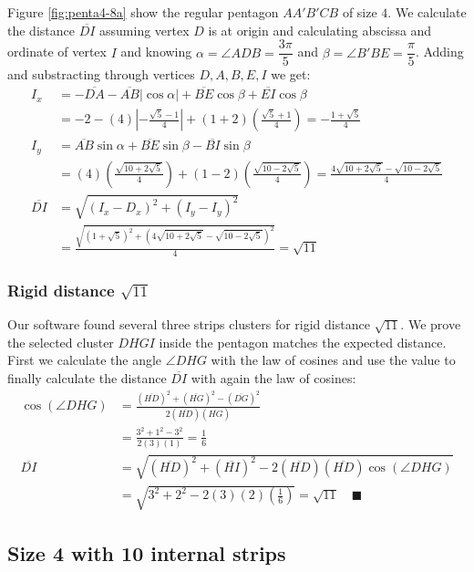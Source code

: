 \documentclass[11pt]{article}
\begin{document}
Figure \ref{fig:penta4-8a} show the regular pentagon $AA'B'CB$ of size $4$. We calculate the distance $\overline{DI}$ assuming vertex $D$ is at origin and calculating abscissa and ordinate of vertex $I$ and knowing $\alpha = \angle{ADB} = \dfrac{3\pi}5$ and $\beta = \angle{B'BE} = \dfrac{\pi}5$. Adding and substracting through vertices $D,A,B,E,I$ we get:
\begin{align}
I_x &= -\overline{DA} - \overline{AB}|\cos\alpha| + \overline{BE}\cos\beta + \overline{EI}\cos\beta \nonumber\\
 &= -2 -(4)\left|-\frac{\sqrt5 - 1}4\right| + (1+2)\left(\frac{\sqrt5+1}4\right)
 = -\frac{1+\sqrt5}4 \\
I_y &= \overline{AB}\sin\alpha + \overline{BE}\sin\beta - \overline{BI}\sin\beta \nonumber\\
 &= (4)\left(\frac{\sqrt{10+2\sqrt5}}4\right) + (1-2)\left(\frac{\sqrt{10-2\sqrt5}}4\right)
 = \frac{4\sqrt{10+2\sqrt5} - \sqrt{10-2\sqrt5}}4 \\
%
\overline{DI} &= \sqrt{(I_x - D_x)^2 + (I_y - I_y)^2} \nonumber\\
 &= \frac{\sqrt{(1+\sqrt5)^2 + (4\sqrt{10+2\sqrt5} - \sqrt{10-2\sqrt5})^2}}4
 = \sqrt{11}
\end{align}

\subsubsection{Rigid distance $\sqrt{11}$}

Our software found several three strips clusters for rigid distance $\sqrt{11}$. We prove the selected cluster $DHGI$ inside the pentagon matches the expected distance. First we calculate the angle $\angle{DHG}$ with the law of cosines and use the value to finally calculate the distance $\overline{DI}$ with again the law of cosines:
\begin{align}
\cos(\angle{DHG}) &= \frac{(\overline{HD})^2 + (\overline{HG})^2 - (\overline{DG})^2}
 {2(\overline{HD})(\overline{HG})} \nonumber\\
 &= \frac{3^2 + 1^2 - 3^2}{2(3)(1)} = \frac{1}6 \\
\overline{DI} &= \sqrt{(\overline{HD})^2 + (\overline{HI})^2
 - 2(\overline{HD})(\overline{HD})\cos(\angle{DHG})} \nonumber\\
 &= \sqrt{3^2 + 2^2 - 2(3)(2)\left(\frac{1}6\right)} = \sqrt{11} \quad\blacksquare
\end{align}

\subsection{Size 4 with 10 internal strips}
\end{document}

